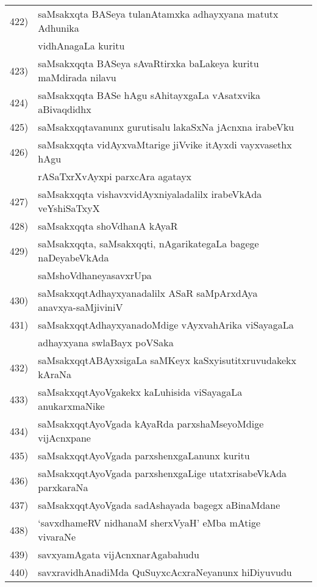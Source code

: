 {\begin{longtable}{@{}cp{7.4cm}r}
422) & saMsakxqta BASeya tulanAtamxka adhayxyana matutx Adhunika & \\
     & vidhAnagaLa kuritu & \pageref{page52}\\
423)  & saMsakxqqta BASeya sAvaRtirxka baLakeya kuritu maMdirada nilavu & \pageref{page33}\\
424) & saMsakxqqta BASe hAgu sAhitayxgaLa vAsatxvika aBivaqdidhx & \pageref{page31}\\
425) & saMsakxqqtavanunx gurutisalu lakaSxNa jAcnxna irabeVku & \pageref{page1}\\ 
426) & saMsakxqqta vidAyxvaMtarige jiVvike itAyxdi vayxvasethx hAgu & \\
     & rASaTxrXvAyxpi parxcAra agatayx & \pageref{page46}\\
427) & saMsakxqqta vishavxvidAyxniyaladalilx irabeVkAda veYshiSaTxyX & \pageref{page37}\\
428) &  saMsakxqqta shoVdhanA kAyaR & \pageref{page53}\\
429) & saMsakxqqta, saMsakxqqti, nAgarikategaLa bagege naDeyabeVkAda & \\
     & saMshoVdhaneyasavxrUpa & \pageref{page53}\\
430) & saMsakxqqtAdhayxyanadalilx ASaR saMpArxdAya anavxya-saMjiviniV & \pageref{page45} \\
431) & saMsakxqqtAdhayxyanadoMdige vAyxvahArika viSayagaLa  & \\
     & adhayxyana swlaBayx poVSaka & \pageref{page47}\\
432) & saMsakxqqtABAyxsigaLa saMKeyx kaSxyisutitxruvudakekx kAraNa & \pageref{page45}\\
433) & saMsakxqqtAyoVgakekx kaLuhisida viSayagaLa anukarxmaNike & \pageref{20d}\\
434) & saMsakxqqtAyoVgada kAyaRda parxshaMseyoMdige vijAcnxpane & \pageref{page21}\\
435) & saMsakxqqtAyoVgada parxshenxgaLanunx kuritu & \pageref{page29}\\ 
436) & saMsakxqqtAyoVgada parxshenxgaLige utatxrisabeVkAda parxkaraNa & \pageref{page19}\\
437) & saMsakxqqtAyoVgada sadAshayada bagegx aBinaMdane & \pageref{page29}\\
438) & `savxdhameRV nidhanaM sherxVyaH' eMba mAtige vivaraNe & \pageref{page197}\\
439) & savxyamAgata vijAcnxnarAgabahudu & \pageref{page107}\\
440) & savxravidhAnadiMda QuSuyxcAcxraNeyanunx hiDiyuvudu & \pageref{page122}\\

\end{longtable}}
